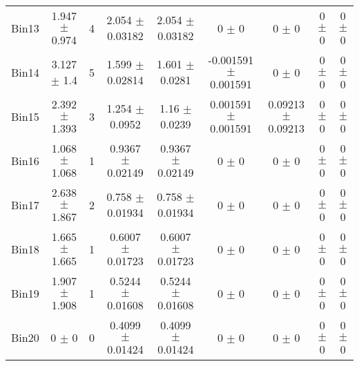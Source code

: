 \begin{tabular}{@{\extracolsep{4pt}}lcccccccc@{}}
     Bin13 & 1.947 $\pm$ 0.974 & 4 & 2.054 $\pm$ 0.03182 & 2.054 $\pm$ 0.03182 & 0 $\pm$ 0 & 0 $\pm$ 0 & 0 $\pm$ 0 & 0 $\pm$ 0 \\ 
     Bin14 & 3.127 $\pm$ 1.4 & 5 & 1.599 $\pm$ 0.02814 & 1.601 $\pm$ 0.0281 & -0.001591 $\pm$ 0.001591 & 0 $\pm$ 0 & 0 $\pm$ 0 & 0 $\pm$ 0 \\ 
     Bin15 & 2.392 $\pm$ 1.393 & 3 & 1.254 $\pm$ 0.0952 & 1.16 $\pm$ 0.0239 & 0.001591 $\pm$ 0.001591 & 0.09213 $\pm$ 0.09213 & 0 $\pm$ 0 & 0 $\pm$ 0 \\ 
     Bin16 & 1.068 $\pm$ 1.068 & 1 & 0.9367 $\pm$ 0.02149 & 0.9367 $\pm$ 0.02149 & 0 $\pm$ 0 & 0 $\pm$ 0 & 0 $\pm$ 0 & 0 $\pm$ 0 \\ 
     Bin17 & 2.638 $\pm$ 1.867 & 2 & 0.758 $\pm$ 0.01934 & 0.758 $\pm$ 0.01934 & 0 $\pm$ 0 & 0 $\pm$ 0 & 0 $\pm$ 0 & 0 $\pm$ 0 \\ 
     Bin18 & 1.665 $\pm$ 1.665 & 1 & 0.6007 $\pm$ 0.01723 & 0.6007 $\pm$ 0.01723 & 0 $\pm$ 0 & 0 $\pm$ 0 & 0 $\pm$ 0 & 0 $\pm$ 0 \\ 
     Bin19 & 1.907 $\pm$ 1.908 & 1 & 0.5244 $\pm$ 0.01608 & 0.5244 $\pm$ 0.01608 & 0 $\pm$ 0 & 0 $\pm$ 0 & 0 $\pm$ 0 & 0 $\pm$ 0 \\ 
     Bin20 & 0 $\pm$ 0 & 0 & 0.4099 $\pm$ 0.01424 & 0.4099 $\pm$ 0.01424 & 0 $\pm$ 0 & 0 $\pm$ 0 & 0 $\pm$ 0 & 0 $\pm$ 0 \\ 
\hline\hline
  \end{tabular}

